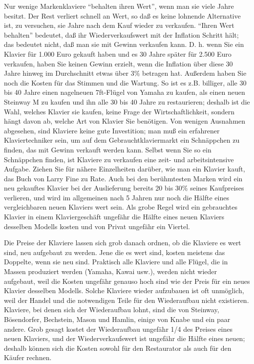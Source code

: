 Nur wenige Markenklaviere \enquote{behalten ihren Wert}, wenn man sie viele Jahre besitzt.
Der Rest verliert schnell an Wert, so daß es keine lohnende Alternative ist, zu versuchen, sie Jahre nach dem Kauf wieder zu verkaufen.
\enquote{Ihren Wert behalten} bedeutet, daß ihr Wiederverkaufswert mit der Inflation Schritt hält; das bedeutet nicht, daß man sie mit Gewinn verkaufen kann.
D. h. wenn Sie ein Klavier für 1.000 Euro gekauft haben und es 30 Jahre später für 2.500 Euro verkaufen, haben Sie keinen Gewinn erzielt, wenn die Inflation über diese 30 Jahre hinweg im Durchschnitt etwas über 3\% betragen hat.
Außerdem haben Sie noch die Kosten für das Stimmen und die Wartung.
So ist es z.B. billiger, alle 30 bis 40 Jahre einen nagelneuen 7ft-Flügel von Yamaha zu kaufen, als einen neuen Steinway M zu kaufen und ihn alle 30 bis 40 Jahre zu restaurieren; deshalb ist die Wahl, welches Klavier sie kaufen, keine Frage der Wirtschaftlichkeit, sondern hängt davon ab, welche Art von Klavier Sie benötigen.
Von wenigen Ausnahmen abgesehen, sind Klaviere keine gute Investition; man muß ein erfahrener Klaviertechniker sein, um auf dem Gebrauchtklaviermarkt ein Schnäppchen zu finden, das mit Gewinn verkauft werden kann.
Selbst wenn Sie so ein Schnäppchen finden, ist Klaviere zu verkaufen eine zeit- und arbeitsintensive Aufgabe.
Ziehen Sie für nähere Einzelheiten darüber, wie man ein Klavier kauft, das Buch von Larry Fine zu Rate.
Auch bei den berühmtesten Marken wird ein neu gekauftes Klavier bei der Auslieferung bereits 20 bis 30\% seines Kaufpreises verlieren, und wird im allgemeinen nach 5 Jahren nur noch die Hälfte eines vergleichbaren neuen Klaviers wert sein.
Als grobe Regel wird ein gebrauchtes Klavier in einem Klaviergeschäft ungefähr die Hälfte eines neuen Klaviers desselben Modells kosten und von Privat ungefähr ein Viertel.

Die Preise der Klaviere lassen sich grob danach ordnen, ob die Klaviere es wert sind, neu aufgebaut zu werden.
Jene die es wert sind, kosten meistens das Doppelte, wenn sie neu sind.
Praktisch alle Klaviere und alle Flügel, die in Massen produziert werden (Yamaha, Kawai usw.), werden nicht wieder aufgebaut, weil die Kosten ungefähr genauso hoch sind wie der Preis für ein neues Klavier desselben Modells.
Solche Klaviere wieder aufzubauen ist oft unmöglich, weil der Handel und die notwendigen Teile für den Wiederaufbau nicht existieren.
Klaviere, bei denen sich der Wiederaufbau lohnt, sind die von Steinway, Bösendorfer, Bechstein, Mason und Hamlin, einige von Knabe und ein paar andere.
Grob gesagt kostet der Wiederaufbau ungefähr 1/4 des Preises eines neuen Klaviers, und der Wiederverkaufswert ist ungefähr die Hälfte eines neuen; deshalb können sich die Kosten sowohl für den Restaurator als auch für den Käufer rechnen.


